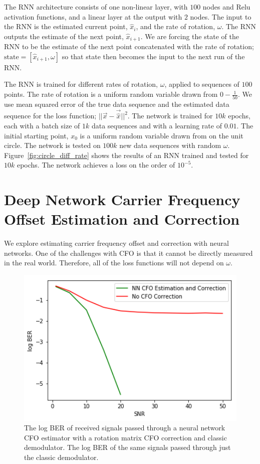 The RNN architecture consists of one non-linear layer, with $100$ nodes and Relu activation functions, and a linear layer at the output with $2$ nodes. The input to the RNN is the estimated current point, $\hat{x}_i$, and the rate of rotation, $\omega$.  The RNN outputs the estimate of the next point, $\hat{x}_{i+1}$.  We are forcing the state of the RNN to be the estimate of the next point concatenated with the rate of rotation; $\text{state} = [\hat{x}_{i+1},\omega]$ so that state then becomes the input to the next run of the RNN.

The RNN is trained for different rates of rotation, $\omega$, applied to sequences of $100$ points.
The rate of rotation is a uniform random variable drawn from $0-\frac{1}{50}$.
We use mean squared error of the true data sequence and the estimated data sequence for the loss function; $||\vec{x}-\vec{\hat{x}}||^2$.  The network is trained for $10k$ epochs, each with a batch size of $1k$ data sequences and with a learning rate of $0.01$.  The initial starting point, $x_0$ is a uniform random variable drawn from on the unit circle.
The network is tested on $100k$ new data sequences with random $\omega$.
Figure~\ref{fig:circle_diff_rate} shows the results of an RNN trained and tested for $10k$ epochs.  The network achieves a loss on the order of $10^{-5}$.


\section{Deep Network Carrier Frequency Offset Estimation and Correction}

We explore estimating carrier frequency offset and correction with neural networks.
One of the challenges with CFO is that it cannot be directly measured in the real world.  
Therefore, all of the loss functions will not depend on $\omega$.

\begin{figure}
\begin{center}
\includegraphics[width=12cm]{figures/cfo/cfo_estimation.png}
\caption{The log BER of received signals passed through a neural network CFO estimator with a rotation matrix CFO correction and classic demodulator. The log BER of the same signals passed through just the classic demodulator.}
\label{fig:cfo_est}
\end{center}
\end{figure}

